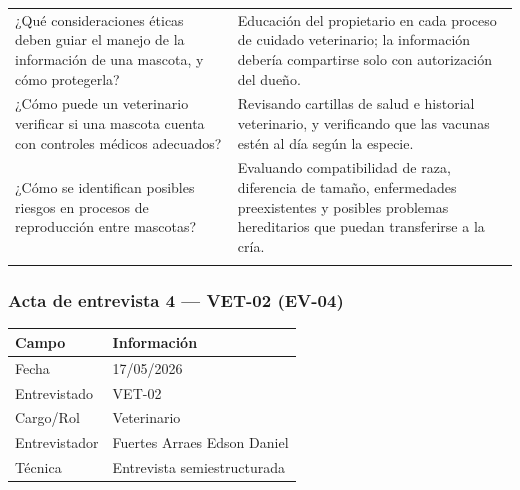 \documentclass[journal,onecolumn]{IEEEtran}
\begin{document}
{\begin{longtable}{@{}p{5.6cm} p{9.4cm}@{}}
		¿Qué consideraciones éticas deben guiar el manejo de la información de una mascota, y cómo protegerla? & Educación del propietario en cada proceso de cuidado veterinario; la información debería compartirse solo con autorización del dueño. \\ \addlinespace
		
		¿Cómo puede un veterinario verificar si una mascota cuenta con controles médicos adecuados? & Revisando cartillas de salud e historial veterinario, y verificando que las vacunas estén al día según la especie. \\ \addlinespace
		
		¿Cómo se identifican posibles riesgos en procesos de reproducción entre mascotas? & Evaluando compatibilidad de raza, diferencia de tamaño, enfermedades preexistentes y posibles problemas hereditarios que puedan transferirse a la cría. \\ \addlinespace
		
	\end{longtable}
}


\subsubsection*{Acta de entrevista 4 --- VET-02 (EV-04)}

\begin{table}[H]
	\centering\small
	\begin{tabularx}{\textwidth}{@{}l X@{}}
		\toprule
		\textbf{Campo} & \textbf{Información} \\
		\midrule
		
		Fecha & 17/05/2026 \\
		
		Entrevistado & VET-02 \\
		
		Cargo/Rol & Veterinario \\
		
		Entrevistador & Fuertes Arraes Edson Daniel \\
		
		Técnica & Entrevista semiestructurada \\
		
		\bottomrule
	\end{tabularx}
\end{table}
\end{document}
